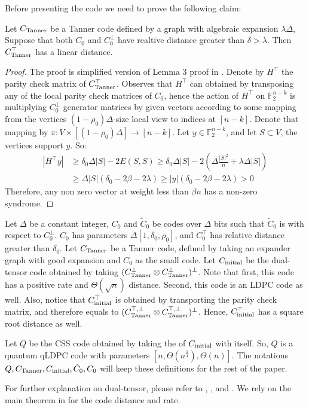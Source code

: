 Before presenting the code we need to prove the following claim:
\begin{claim}
  Let $C_{\text{Tanner}}$ be a Tanner code defined by a graph with algebraic expansion $\lambda \Delta$, Suppose that both $C_{0}$ and $C_{0}^{\perp}$ have realtive distance greater than $\delta > \lambda$. Then $C_{\text{Tanner}}^{\top}$ has a linear distance.
\end{claim}
\begin{proof}
The proof is simplified version of Lemma 3 proof in \cite{Panteleev_2022}.  Denote by $H^\top$ the parity check matrix of $C_{\text{Tanner}}^\top$. Observes that $H^\top$ can obtained by transposing any of the local parity check matrices of $C_0$, hence the action of $H^{\top}$ on $\mathbb{F}_{2}^{n-k}$ is multiplying $C_{0}^{\perp}$ generator matrices by given vectors according to some mapping from the vertices $(1-\rho_{0})\Delta$-size local view to indices at $[n - k]$. Denote that mapping by $\pi : V \times [(1-\rho_{0})\Delta] \rightarrow [n-k]$.    
  Let $y \in \mathbb{F}_{2}^{n-k}$, and let $S \subset V$, the vertices support $y$. So: \begin{equation*}
    \begin{split}
      | H^\top y | & \ge \delta_{0}\Delta|S| - 2E(S,S) \ge \delta_{0}\Delta|S| - 2\left( \Delta\frac{|S|^2}{n} + \lambda\Delta|S| \right) \\
      & \ge \Delta |S|\left( \delta_{0} - 2\beta - 2\lambda  \right) \ge |y| \left( \delta_{0} - 2\beta - 2\lambda  \right) > 0
    \end{split}
  \end{equation*}
  Therefore, any non zero vector at weight less than $\beta n$ has a non-zero syndrome.
\end{proof}

\begin{definition}
  \label{def:thecode}
Let $\Delta$ be a constant integer, $C_{0}$ and $\tilde{C}_{0}$ be codes over $\Delta$ bits such that $\tilde{C}_{0}$ is \trig with respect to $C^{\perp}_{0}$. $C_{0}$ has parameters $\Delta[1,\delta_{0},\rho_{0}]$, and $C_{0}^\top$ has relative distance greater than $\delta_{0}$. Let $C_{\text{Tanner}}$ be a Tanner code, defined by taking an expander graph with good expansion and $C_{0}$ as the small code. Let $C_{\text{initial}}$ be the dual-tensor code obtained by taking $(C_{\text{Tanner}}^\perp \otimes C_{\text{Tanner}}^\perp )^\perp$. Note that first, this code has a positive rate and $\Theta(\sqrt{n})$ distance. Second, this code is an LDPC code as well. Also, notice that $C_{\text{initial}}^{\top}$ is obtained by transporting the parity check matrix, and therefore equals to $(C_{\text{Tanner}}^{\top, \perp} \otimes C_{\text{Tanner}}^{\top, \perp} )^\perp$. Hence, $C_{\text{initial}}^{\top}$ has a square root distance as well.

Let $Q$ be the CSS code obtained by taking the \Hyp of $C_{\text{initial}}$ with itself. So, $Q$ is a quantum qLDPC code with parameters $[n, \Theta(n^{\frac{1}{4}}), \Theta(n)]$. The notations $Q,C_{\text{Tanner}}, C_{\text{initial}}, \tilde{C}_{0}, C_{0}$ will keep these definitions for the rest of the paper.
\end{definition}
For further explanation on dual-tensor, please refer to \cite{leverrier2022quantum}, \cite{Dinur}, and \cite{Pavel}. We rely on the main theorem in \cite{Tillich_2014} for the \Hyp code distance and rate.

